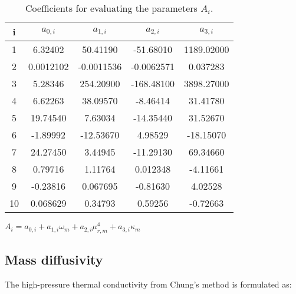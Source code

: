 \begin{table}
    \centering
    \caption{Coefficients for evaluating the parameters $A_i$.}\label{Ai_table}
    \begin{threeparttable} 
\begin{tabular*}{0.8\textwidth}{c|cccc}
    \toprule
    i     & $a_{0,i}$        & $a_{1,i}$         & $a_{2,i}$       & $a_{3,i}$   \\
    \midrule
    1     & 6.32402          & 50.41190          & -51.68010       & 1189.02000  \\
    2     & 0.0012102        & -0.0011536        & -0.0062571      & 0.037283    \\
    3     & 5.28346          & 254.20900         & -168.48100      & 3898.27000  \\
    4     & 6.62263          & 38.09570          & -8.46414        & 31.41780    \\
    5     & 19.74540         & 7.63034           & -14.35440       & 31.52670    \\
    6     & -1.89992         & -12.53670         & 4.98529         & -18.15070   \\
    7     & 24.27450         & 3.44945           & -11.29130       & 69.34660    \\
    8     & 0.79716          & 1.11764           & 0.012348        & -4.11661    \\
    9     & -0.23816         & 0.067695          & -0.81630        & 4.02528     \\
    10    & 0.068629         & 0.34793           & 0.59256         & -0.72663    \\
    \bottomrule
\end{tabular*}
\begin{tablenotes}
    \footnotesize    
    \item $A_{i} = a_{0,i} + a_{1,i}\omega_m + a_{2,i} \mu_{r,m}^4 + a_{3,i} \kappa_m$\\
  \end{tablenotes}
\end{threeparttable}
\end{table}

\subsection{Mass diffusivity}
The high-pressure thermal conductivity from Chung's method \cite{chung1988generalized} is formulated as:

